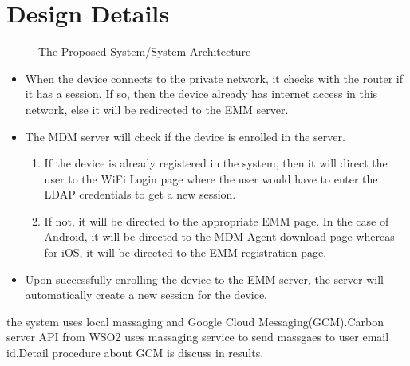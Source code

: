 \section{Design Details}
\begin{figure}[h!]
\begin{center}
\end{center}
\caption {The Proposed System/System Architecture}
\label{vmb2}
\vspace{0mm}
\end{figure}

\par 
\begin{itemize}

    \item When the device connects to the private network, it checks with the router if it has a session. If so, then the device already has internet access in this network, else it will be redirected to the EMM server.
    \item The MDM server will check if the device is enrolled in the server.
    \begin{enumerate}
        \item If the device is already registered in the system, then it will direct the user to the WiFi Login page where the user would have to enter the LDAP credentials to get a new session.
        \item If not, it will be directed to the appropriate EMM page. In the case of Android, it will be directed to the MDM Agent download page whereas for iOS, it will be directed to the EMM registration page.
        \end{enumerate}
    \item Upon successfully enrolling the device to the EMM server, the server will automatically create a new session for the device.
\end{itemize}
\hspace{5mm} the system uses local massaging and Google Cloud Messaging(GCM).Carbon server API from WSO2 uses massaging service to send massgaes to user email id.Detail procedure about GCM is discuss in results.

